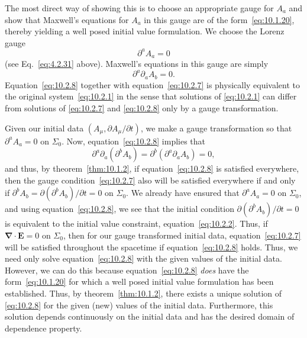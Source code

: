 The most direct way of showing this is to choose an appropriate gauge for \(A_a\) and
show that Maxwell's equations for \(A_a\) in this gauge are of the
form~\eqref{eq:10.1.20}, thereby yielding a well posed initial value formulation. We
choose the Lorenz gauge
\begin{equation}
  \partial^aA_a=0
  \tag{10.2.7}\label{eq:10.2.7}
\end{equation}
(see Eq.~\eqref{eq:4.2.31} above). Maxwell's equations in this gauge are simply
\begin{equation}
  \partial^a\partial_aA_b=0.
  \tag{10.2.8}\label{eq:10.2.8}
\end{equation}
Equation~\eqref{eq:10.2.8} together with equation~\eqref{eq:10.2.7} is physically
equivalent to the original system~\eqref{eq:10.2.1} in the sense that solutions of
\eqref{eq:10.2.1} can differ from solutions of \eqref{eq:10.2.7} and
\eqref{eq:10.2.8} only by a gauge transformation.

Given our initial data \((A_\mu,\partial A_\mu/\partial t)\), we make a gauge
transformation so that \(\partial^aA_a=0\) on \(\Sigma_0\). Now,
equation~\eqref{eq:10.2.8} implies that
\begin{equation}
  \partial^a\partial_a(\partial^bA_b)
  =\partial^b(\partial^a\partial_aA_b)=0,
  \tag{10.2.9}\label{eq:10.2.9}
\end{equation}
and thus, by theorem~\ref{thm:10.1.2}, if equation~\eqref{eq:10.2.8} is satisfied
everywhere, then the gauge condition~\eqref{eq:10.2.7} also will be satisfied
everywhere if and only if \(\partial^bA_b=\partial(\partial^bA_b)/\partial t=0\) on
\(\Sigma_0\). We already have ensured that \(\partial^aA_a=0\) on \(\Sigma_0\),
and using equation~\eqref{eq:10.2.8}, we see that the initial condition
\(\partial(\partial^bA_b)/\partial t=0\) is equivalent to the initial value constraint,
equation~\eqref{eq:10.2.2}. Thus, if
\(\boldsymbol{\nabla}\mathbin{\cdot}\mathbf{E}=0\) on \(\Sigma_0\), then for our gauge
transformed initial data, equation~\eqref{eq:10.2.7} will be satisfied throughout the
spacetime if equation~\eqref{eq:10.2.8} holds. Thus, we need only solve
equation~\eqref{eq:10.2.8} with the given values of the initial data. However, we
can do this because equation~\eqref{eq:10.2.8} \emph{does} have the
form~\eqref{eq:10.1.20} for which a well posed initial value formulation has been
established. Thus, by theorem~\ref{thm:10.1.2}, there exists a unique solution of
\eqref{eq:10.2.8} for the given (new) values of the initial data. Furthermore, this
solution depends continuously on the initial data and has the desired domain of
dependence property.

